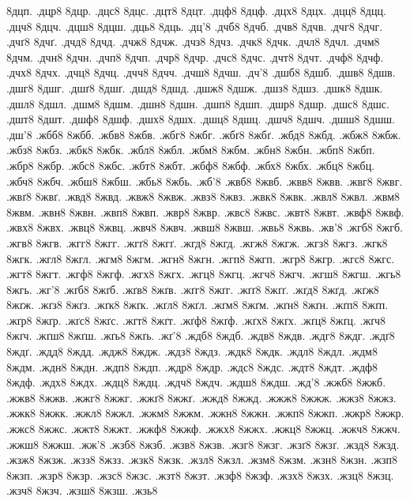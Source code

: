 {8дцп.
.дцр8
8дцр.
.дцс8
8дцс.
.дцт8
8дцт.
.дцф8
8дцф.
.дцх8
8дцх.
.дцц8
8дцц.
.дцч8
8дцч.
.дцш8
8дцш.
.дць8
8дць.
.дц'8
.дчб8
8дчб.
.дчв8
8дчв.
.дчг8
8дчг.
.дчґ8
8дчґ.
.дчд8
8дчд.
.дчж8
8дчж.
.дчз8
8дчз.
.дчк8
8дчк.
.дчл8
8дчл.
.дчм8
8дчм.
.дчн8
8дчн.
.дчп8
8дчп.
.дчр8
8дчр.
.дчс8
8дчс.
.дчт8
8дчт.
.дчф8
8дчф.
.дчх8
8дчх.
.дчц8
8дчц.
.дчч8
8дчч.
.дчш8
8дчш.
.дч'8
.дшб8
8дшб.
.дшв8
8дшв.
.дшг8
8дшг.
.дшґ8
8дшґ.
.дшд8
8дшд.
.дшж8
8дшж.
.дшз8
8дшз.
.дшк8
8дшк.
.дшл8
8дшл.
.дшм8
8дшм.
.дшн8
8дшн.
.дшп8
8дшп.
.дшр8
8дшр.
.дшс8
8дшс.
.дшт8
8дшт.
.дшф8
8дшф.
.дшх8
8дшх.
.дшц8
8дшц.
.дшч8
8дшч.
.дшш8
8дшш.
.дш'8
.жбб8
8жбб.
.жбв8
8жбв.
.жбг8
8жбг.
.жбґ8
8жбґ.
.жбд8
8жбд.
.жбж8
8жбж.
.жбз8
8жбз.
.жбк8
8жбк.
.жбл8
8жбл.
.жбм8
8жбм.
.жбн8
8жбн.
.жбп8
8жбп.
.жбр8
8жбр.
.жбс8
8жбс.
.жбт8
8жбт.
.жбф8
8жбф.
.жбх8
8жбх.
.жбц8
8жбц.
.жбч8
8жбч.
.жбш8
8жбш.
.жбь8
8жбь.
.жб'8
.жвб8
8жвб.
.жвв8
8жвв.
.жвг8
8жвг.
.жвґ8
8жвґ.
.жвд8
8жвд.
.жвж8
8жвж.
.жвз8
8жвз.
.жвк8
8жвк.
.жвл8
8жвл.
.жвм8
8жвм.
.жвн8
8жвн.
.жвп8
8жвп.
.жвр8
8жвр.
.жвс8
8жвс.
.жвт8
8жвт.
.жвф8
8жвф.
.жвх8
8жвх.
.жвц8
8жвц.
.жвч8
8жвч.
.жвш8
8жвш.
.жвь8
8жвь.
.жв'8
.жгб8
8жгб.
.жгв8
8жгв.
.жгг8
8жгг.
.жгґ8
8жгґ.
.жгд8
8жгд.
.жгж8
8жгж.
.жгз8
8жгз.
.жгк8
8жгк.
.жгл8
8жгл.
.жгм8
8жгм.
.жгн8
8жгн.
.жгп8
8жгп.
.жгр8
8жгр.
.жгс8
8жгс.
.жгт8
8жгт.
.жгф8
8жгф.
.жгх8
8жгх.
.жгц8
8жгц.
.жгч8
8жгч.
.жгш8
8жгш.
.жгь8
8жгь.
.жг'8
.жґб8
8жґб.
.жґв8
8жґв.
.жґг8
8жґг.
.жґґ8
8жґґ.
.жґд8
8жґд.
.жґж8
8жґж.
.жґз8
8жґз.
.жґк8
8жґк.
.жґл8
8жґл.
.жґм8
8жґм.
.жґн8
8жґн.
.жґп8
8жґп.
.жґр8
8жґр.
.жґс8
8жґс.
.жґт8
8жґт.
.жґф8
8жґф.
.жґх8
8жґх.
.жґц8
8жґц.
.жґч8
8жґч.
.жґш8
8жґш.
.жґь8
8жґь.
.жґ'8
.ждб8
8ждб.
.ждв8
8ждв.
.ждг8
8ждг.
.ждґ8
8ждґ.
.ждд8
8ждд.
.ждж8
8ждж.
.ждз8
8ждз.
.ждк8
8ждк.
.ждл8
8ждл.
.ждм8
8ждм.
.ждн8
8ждн.
.ждп8
8ждп.
.ждр8
8ждр.
.ждс8
8ждс.
.ждт8
8ждт.
.ждф8
8ждф.
.ждх8
8ждх.
.ждц8
8ждц.
.ждч8
8ждч.
.ждш8
8ждш.
.жд'8
.жжб8
8жжб.
.жжв8
8жжв.
.жжг8
8жжг.
.жжґ8
8жжґ.
.жжд8
8жжд.
.жжж8
8жжж.
.жжз8
8жжз.
.жжк8
8жжк.
.жжл8
8жжл.
.жжм8
8жжм.
.жжн8
8жжн.
.жжп8
8жжп.
.жжр8
8жжр.
.жжс8
8жжс.
.жжт8
8жжт.
.жжф8
8жжф.
.жжх8
8жжх.
.жжц8
8жжц.
.жжч8
8жжч.
.жжш8
8жжш.
.жж'8
.жзб8
8жзб.
.жзв8
8жзв.
.жзг8
8жзг.
.жзґ8
8жзґ.
.жзд8
8жзд.
.жзж8
8жзж.
.жзз8
8жзз.
.жзк8
8жзк.
.жзл8
8жзл.
.жзм8
8жзм.
.жзн8
8жзн.
.жзп8
8жзп.
.жзр8
8жзр.
.жзс8
8жзс.
.жзт8
8жзт.
.жзф8
8жзф.
.жзх8
8жзх.
.жзц8
8жзц.
.жзч8
8жзч.
.жзш8
8жзш.
.жзь8
}

